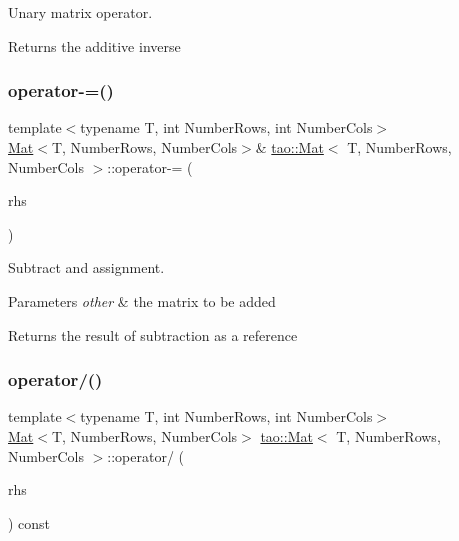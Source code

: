 Unary matrix operator. 

\begin{DoxyReturn}{Returns}
the additive inverse 
\end{DoxyReturn}
\mbox{\label{classtao_1_1_mat_a6bc77952fe5ed450eded94145cde42a1}} 
\subsubsection{\texorpdfstring{operator-\/=()}{operator-=()}}
{\footnotesize\ttfamily template$<$typename T, int Number\+Rows, int Number\+Cols$>$ \\
\mbox{\hyperlink{classtao_1_1_mat}{Mat}}$<$T, Number\+Rows, Number\+Cols$>$\& \mbox{\hyperlink{classtao_1_1_mat}{tao\+::\+Mat}}$<$ T, Number\+Rows, Number\+Cols $>$\+::operator-\/= (\begin{DoxyParamCaption}\item[{const \mbox{\hyperlink{classtao_1_1_mat}{Mat}}$<$ T, Number\+Rows, Number\+Cols $>$ \&}]{rhs }\end{DoxyParamCaption})\hspace{0.3cm}{\ttfamily [inline]}}



Subtract and assignment. 


\begin{DoxyParams}{Parameters}
{\em other} & the matrix to be added \\
\hline
\end{DoxyParams}
\begin{DoxyReturn}{Returns}
the result of subtraction as a reference 
\end{DoxyReturn}
\mbox{\label{classtao_1_1_mat_accb7566993c45504e983484ae0426071}} 
\subsubsection{\texorpdfstring{operator/()}{operator/()}\hspace{0.1cm}{\footnotesize\ttfamily [1/2]}}
{\footnotesize\ttfamily template$<$typename T, int Number\+Rows, int Number\+Cols$>$ \\
\mbox{\hyperlink{classtao_1_1_mat}{Mat}}$<$T, Number\+Rows, Number\+Cols$>$ \mbox{\hyperlink{classtao_1_1_mat}{tao\+::\+Mat}}$<$ T, Number\+Rows, Number\+Cols $>$\+::operator/ (\begin{DoxyParamCaption}\item[{const \mbox{\hyperlink{classtao_1_1_mat}{Mat}}$<$ T, Number\+Rows, Number\+Cols $>$ \&}]{rhs }\end{DoxyParamCaption}) const\hspace{0.3cm}{\ttfamily [inline]}}



